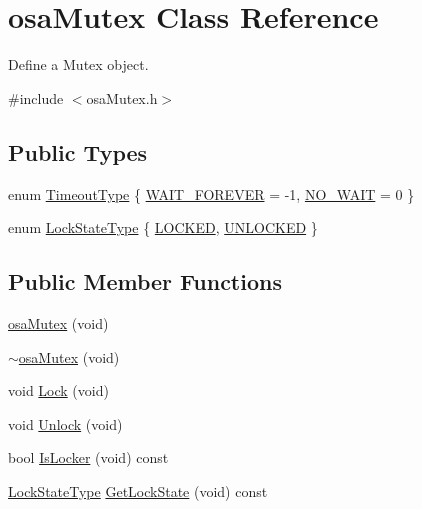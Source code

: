 \hypertarget{classosa_mutex}{\section{osa\-Mutex Class Reference}
\label{classosa_mutex}
}


Define a Mutex object.  




{\ttfamily \#include $<$osa\-Mutex.\-h$>$}

\subsection*{Public Types}
\begin{DoxyCompactItemize}
\item 
enum \hyperlink{classosa_mutex_a1331d5ff33336e89fc504125ddbc41a6}{Timeout\-Type} \{ \hyperlink{classosa_mutex_a1331d5ff33336e89fc504125ddbc41a6a0fa63ec436bd067c5fa29a458799ed8e}{W\-A\-I\-T\-\_\-\-F\-O\-R\-E\-V\-E\-R} = -\/1, 
\hyperlink{classosa_mutex_a1331d5ff33336e89fc504125ddbc41a6a8de433eae9ef48be38321f282630a923}{N\-O\-\_\-\-W\-A\-I\-T} = 0
 \}
\item 
enum \hyperlink{classosa_mutex_ad75274806c7433f960e8ff0c8c9d7470}{Lock\-State\-Type} \{ \hyperlink{classosa_mutex_ad75274806c7433f960e8ff0c8c9d7470a9a1066b23b0fa8c5ede7400b850dbd5a}{L\-O\-C\-K\-E\-D}, 
\hyperlink{classosa_mutex_ad75274806c7433f960e8ff0c8c9d7470a4173bfeaab7cd673588015a5529022fa}{U\-N\-L\-O\-C\-K\-E\-D}
 \}
\end{DoxyCompactItemize}
\subsection*{Public Member Functions}
\begin{DoxyCompactItemize}
\item 
\hyperlink{classosa_mutex_a81d988c657bbdb869840154492175c06}{osa\-Mutex} (void)
\item 
\hyperlink{classosa_mutex_abc1633a5825ebe4d247aa28e9ff250f8}{$\sim$osa\-Mutex} (void)
\item 
void \hyperlink{classosa_mutex_ae4cd451e30227c406bd0ffd38595ea2f}{Lock} (void)
\item 
void \hyperlink{classosa_mutex_a22e3e6d7583ec492b3560fad23d31cbc}{Unlock} (void)
\item 
bool \hyperlink{classosa_mutex_a46ee7fc86b7670322ea2db737cbc72ee}{Is\-Locker} (void) const 
\item 
\hyperlink{classosa_mutex_ad75274806c7433f960e8ff0c8c9d7470}{Lock\-State\-Type} \hyperlink{classosa_mutex_a6ece8ae92f2105358ca56f55536002e0}{Get\-Lock\-State} (void) const 
\end{DoxyCompactItemize}


